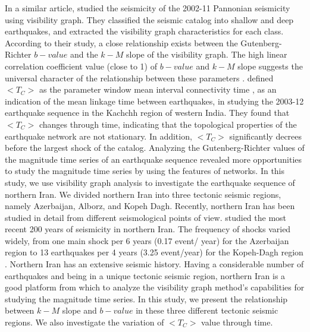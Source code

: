 \noindent
In a similar article, \citet{Telesca2014} studied the seismicity of the 2002-11 Pannonian seismicity using visibility graph. They classified the seismic catalog into shallow and deep earthquakes, and extracted the visibility graph characteristics for each class. According to their study, a close relationship exists between the Gutenberg-Richter $b-value$ and the $k-M$ slope of the visibility graph. The high linear correlation coefficient value (close to 1) of $b-value$ and $k-M$  slope suggests the universal character of the relationship between these parameters \citep{Telesca2014} .   
\noindent
\citet{Telesca2016}   defined    $<T_C>$  as the parameter window mean interval connectivity time ,  as an indication of the mean linkage time between earthquakes, in studying the 2003-12 earthquake sequence in the Kachchh region of western India. They found that  $<T_C>$  changes through time, indicating that the topological properties of the earthquake network are not stationary. In addition,  $<T_C>$  significantly decrees before the largest shock of the catalog. Analyzing the Gutenberg-Richter values of  the magnitude time series of an earthquake sequence revealed more opportunities to study the magnitude time series by using the features of networks. 
\noindent
In this study, we use visibility graph analysis to investigate the earthquake sequence of northern Iran. We divided northern Iran into three tectonic seismic regions, namely Azerbaijan, Alborz, and Kopeh Dagh.  Recently, northern Iran has been studied in detail from different seismological points of view.  \citet{Nemati2015} studied the most recent 200 years of seismicity in northern Iran. The frequency of shocks varied widely, from one main shock per 6 years (0.17 event/ year) for the Azerbaijan region to 13 earthquakes per 4 years (3.25 event/year) for the Kopeh-Dagh region \citep{Nemati2015}. Northern Iran has an extensive seismic history.  Having a considerable number of earthquakes and being in a unique tectonic seismic region, northern Iran is a good platform from which to analyze the visibility graph method's capabilities for studying the magnitude time series. In this study, we present the relationship between  $k-M$  slope and $b-value$  in these three different tectonic seismic regions. We also investigate the variation of  $<T_C>$  value through time.

